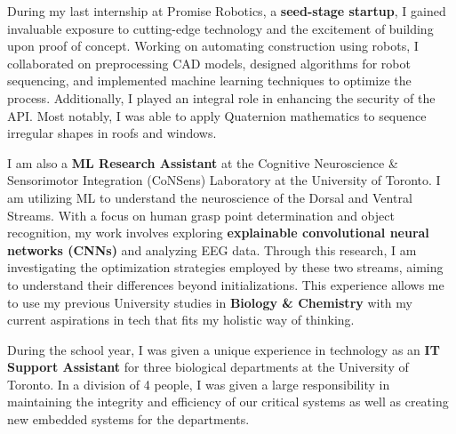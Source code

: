 \documentclass[10.5pt,a4]{article}
\begin{document}
During my last internship at Promise Robotics, a \textbf{seed-stage startup}, I gained invaluable exposure to cutting-edge technology and the excitement of building upon proof of concept. Working on automating construction using robots, I collaborated on preprocessing CAD models, designed algorithms for robot sequencing, and implemented machine learning techniques to optimize the process. Additionally, I played an integral role in enhancing the security of the API. Most notably, I was able to apply Quaternion mathematics to sequence irregular shapes in roofs and windows.

I am also a \textbf{ML Research Assistant} at the Cognitive Neuroscience \& Sensorimotor Integration (CoNSens) Laboratory at the University of Toronto. I am utilizing ML to understand the neuroscience of the Dorsal and Ventral Streams. With a focus on human grasp point determination and object recognition, my work involves exploring \textbf{explainable convolutional neural networks (CNNs)} and analyzing EEG data. Through this research, I am investigating the optimization strategies employed by these two streams, aiming to understand their differences beyond initializations. This experience allows me to use my previous University studies in \textbf{Biology \& Chemistry} with my current aspirations in tech that fits my holistic way of thinking. 

During the school year, I was given a unique experience in technology as an \textbf{IT Support Assistant} for three biological departments at the University of Toronto. In a division of 4 people, I was given a large responsibility in maintaining the integrity and efficiency of our critical systems as well as creating new embedded systems for the departments. 
\end{document}
